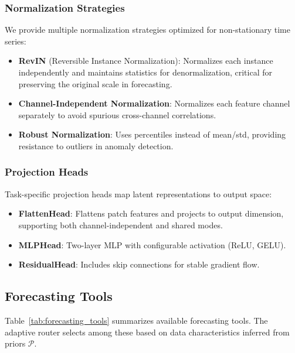 \subsubsection{Normalization Strategies}
\label{appx:normalization}
We provide multiple normalization strategies optimized for non-stationary time series:
\begin{itemize}[leftmargin=*, itemsep=1pt]
    \item \textbf{RevIN} (Reversible Instance Normalization): Normalizes each instance independently and maintains statistics for denormalization, critical for preserving the original scale in forecasting.
    \item \textbf{Channel-Independent Normalization}: Normalizes each feature channel separately to avoid spurious cross-channel correlations.
    \item \textbf{Robust Normalization}: Uses percentiles instead of mean/std, providing resistance to outliers in anomaly detection.
\end{itemize}

\subsubsection{Projection Heads}
\label{appx:projection_heads}
Task-specific projection heads map latent representations to output space:
\begin{itemize}[leftmargin=*, itemsep=1pt]
    \item \textbf{FlattenHead}: Flattens patch features and projects to output dimension, supporting both channel-independent and shared modes.
    \item \textbf{MLPHead}: Two-layer MLP with configurable activation (ReLU, GELU).
    \item \textbf{ResidualHead}: Includes skip connections for stable gradient flow.
\end{itemize}

\subsection{Forecasting Tools}
\label{appx:forecasting_tools}

Table~\ref{tab:forecasting_tools} summarizes available forecasting tools. The adaptive router selects among these based on data characteristics inferred from priors $\mathcal{P}$.

